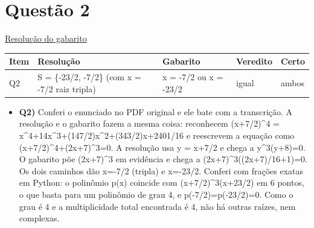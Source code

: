 \documentclass{article}%
\begin{document}
\section*{Questão 2}%
\href{https://poliedroresolve.sistemapoliedro.com.br/vestibulares/ime/2026/ime-2-fase-dia-1-23-10-2025-2-fase-dia-1/dissertativa-2-matematica-2-fase-dia-1-ime-2026}{Resolução do gabarito}\par\smallskip%
\begin{longtable}{@{}p{} p{} p{} p{} p{}@{}}\toprule Item & Resolução & Gabarito & Veredito & Certo \\ \midrule
Q2 & S = \{-23/2, -7/2\} (com x = -7/2 raiz tripla) & x = -7/2 ou x = -23/2 & igual & ambos \\
\bottomrule\end{longtable}%
\begin{itemize}%
\item%
\textbf{Q2)} Conferi o enunciado no PDF original e ele bate com a transcrição. A resolução e o gabarito fazem a mesma coisa: reconhecem (x+7/2)\^{}4 = x\^{}4+14x\^{}3+(147/2)x\^{}2+(343/2)x+2401/16 e reescrevem a equação como (x+7/2)\^{}4+(2x+7)\^{}3=0. A resolução usa y = x+7/2 e chega a y\^{}3(y+8)=0. O gabarito põe (2x+7)\^{}3 em evidência e chega a (2x+7)\^{}3((2x+7)/16+1)=0. Os dois caminhos dão x=-7/2 (tripla) e x=-23/2. Conferi com frações exatas em Python: o polinômio p(x) coincide com (x+7/2)\^{}3(x+23/2) em 6 pontos, o que basta para um polinômio de grau 4, e p(-7/2)=p(-23/2)=0. Como o grau é 4 e a multiplicidade total encontrada é 4, não há outras raízes, nem complexas.%
\end{itemize}%
\end{document}
